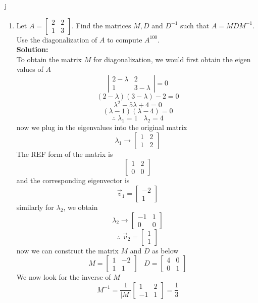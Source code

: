 j\documentclass[12pt]{article}
\begin{document}
\begin{enumerate}
\item  Let $A = \begin{bmatrix} 2&2\\1&3\end{bmatrix}$.  Find the matrices $M, D$ and $D^{-1}$ such that $A = M D M^{-1}$.  Use the diagonalization of $A$ to compute $A^{100}$.\\
\textbf{Solution:}\\
To obtain the matrix $M$ for diagonalization, we would first obtain the eigen values of $A$
\[
\left|
\begin{matrix}
    2-\lambda&2\\
    1&3-\lambda
\end{matrix}
\right|=0
\]
\[
(2-\lambda)(3-\lambda)-2=0
\]
\[
\lambda^2-5\lambda+4=0
\]
\[
(\lambda-1)(\lambda-4)=0
\]
\[
\therefore \; \lambda_1=1 \;\;\; \lambda_2 = 4
\]
now we plug in the eigenvalues into the original matrix
\[
\lambda_1 \rightarrow 
\begin{bmatrix}
    1&2\\
    1&2
\end{bmatrix}
\]
The REF form of the matrix is
\[
\begin{bmatrix}
    1&2\\
    0&0
\end{bmatrix}
\]
and the corresponding eigenvector is
\[
\Vec{v}_1=
\begin{bmatrix}
    -2\\1
\end{bmatrix}
\]
similarly for $\lambda_2$, we obtain
\[
\lambda_2 \rightarrow 
\begin{bmatrix}
    -1&1\\
    0&0
\end{bmatrix}
\]
\[
\therefore \; \Vec{v}_2=
\begin{bmatrix}
    1\\1
\end{bmatrix}
\]
now we can construct the matrix $M$ and $D$ as below
\[
M=
\begin{bmatrix}
    1&-2\\
    1&1
\end{bmatrix}\;\;\;
D=
\begin{bmatrix}
    4&0\\
    0&1
\end{bmatrix}
\]
We now look for the inverse of $M$
\[
M^{-1}=\frac{1}{|M|}
\begin{bmatrix}
    1&2\\
    -1&1
\end{bmatrix}=\frac{1}{3}
\]
\end{enumerate}
\end{document}
